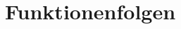 \documentclass[notes=hide,hyperref={dvipdfmx,pdfpagelabels=false}]{beamer}
\begin{document}
% 

\section{Funktionenfolgen}
\end{document}
